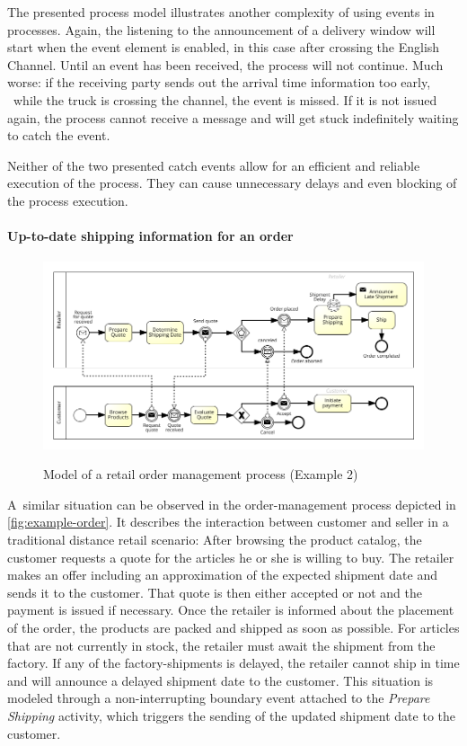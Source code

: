 The presented process model illustrates another complexity of using events in processes. Again, the listening to the announcement of a delivery window will start when the event element is enabled, in this case after crossing the English Channel. 
Until an event has been received, the process will not continue. 
Much worse: if the receiving party sends out the arrival time information too early, \ie~while the truck is crossing the channel, the event is missed. If it is not issued again, the process cannot receive a message and will get stuck indefinitely waiting to catch the event.

Neither of the two presented catch events allow for an efficient and reliable execution of the process. They can cause unnecessary delays and even blocking of the process execution.


\paragraph{Up-to-date shipping information for an order}
\begin{figure}[]
	\myfloatalign
	{\includegraphics[width=1\linewidth]{chapters/requirements/Retail-Order.png}}
	\caption{Model of a retail order management process (Example 2)}
	\label{fig:example-order}
\end{figure}

A~similar situation can be observed in the order-management process depicted in \autoref{fig:example-order}.
It describes the interaction between customer and seller in a traditional distance retail scenario: After browsing the product catalog, the customer requests a quote for the articles he or she is willing to buy.
The retailer makes an offer including an approximation of the expected shipment date and sends it to the customer. That quote is then either accepted or not and the payment is issued if necessary.
Once the retailer is informed about the placement of the order, the products are packed and shipped as soon as possible.
For articles that are not currently in stock, the retailer must await the shipment from the factory. If any of the factory-shipments is delayed, the retailer cannot ship in time and will announce a delayed shipment date to the customer.
This situation is modeled through a non-interrupting boundary event attached to the \textit{Prepare Shipping} activity, which triggers the sending of the updated shipment date to the customer.

